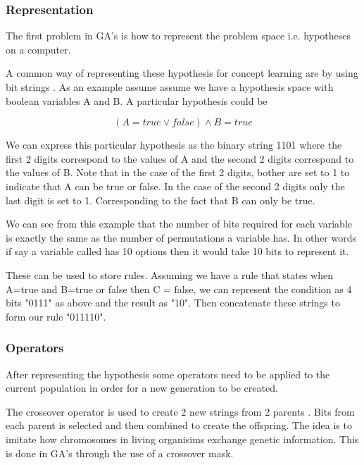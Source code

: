 \documentclass[12pt,a4paper]{report}
\begin{document}
\subsubsection{Representation}

The first problem in GA's is how to represent the problem space i.e. hypotheses on a computer. 

A common way of representing these hypothesis for concept learning are by using bit strings \citep{michell}. As an example assume assume we have a hypothesis space with boolean variables A and B. A particular hypothesis could be

\begin{equation}
(A = true \vee false) \wedge B = true
\end{equation}

We can express this particular hypothesis as the binary string 1101 where the first 2 digits correspond to the values of A and the second 2 digits correspond to the values of B. Note that in the case of the first 2 digits, bother are set to 1 to indicate that A can be true or false. In the case of the second 2 digits only the last digit is set to 1. Corresponding to the fact that B can only be true.  

We can see from this example that the number of bits required for each variable is exactly the same as the number of permutations a variable has. In other words if say a variable called has 10 options then it would take 10 bits to represent it.

These can be used to store rules. Assuming we have a rule that states when A=true and B=true or false then C = false, we can represent the condition as 4 bits "0111" as above and the result as "10". Then concatenate these strings to form our rule "011110".

\subsubsection{Operators}

After representing the hypothesis some operators need to be applied to the current population in order for a new generation to be created.

The crossover operator is used to create 2 new strings from 2 parents \citep{michell}. Bits from each parent is selected and then combined to create the offspring. The idea is to imitate how chromosomes in living organisims exchange genetic information. This is done in GA's through the use of a crossover mask. 
\end{document}
